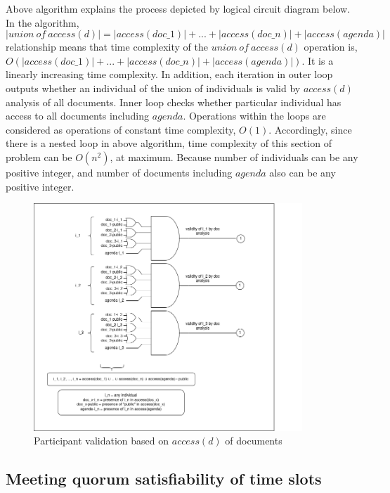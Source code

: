 Above algorithm explains the process depicted by logical circuit diagram below. In the algorithm, 
\[|union\ of\ access(d)| = |access(doc\_1)| + ... + |access(doc\_n)| + |access(agenda)| \]
relationship means that time complexity of the $union\ of\ access(d)$ operation is, $O(|access(doc\_1)| + ... + |access(doc\_n)| + |access(agenda)|)$. It is a linearly increasing time complexity. In addition, each iteration in outer loop outputs whether an individual of the union of individuals is valid by $access(d)$ analysis of all documents. Inner loop checks whether particular individual has access to all documents including $agenda$. Operations within the loops are considered as operations of constant time complexity, $O(1)$. Accordingly, since there is a nested loop in above algorithm, time complexity of this section of problem can be $O(n^{2})$, at maximum. Because number of individuals can be any positive integer, and number of documents including $agenda$ also can be any positive integer. 

\begin{figure}[H]
    \centering
    \includegraphics[width=0.9\textwidth]{./image/circuit_diagram/1_participant_validation.png}
    \caption{Participant validation based on $access(d)$ of documents}
    \label{fig:participant validation based on documents}
\end{figure} 

\subsection{Meeting quorum satisfiability of time slots}
